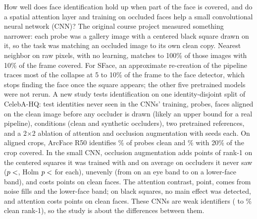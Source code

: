 How well does face identification hold up when part of the face is covered, and do a spatial attention layer and training on occluded faces help a small convolutional neural network (CNN)? The original course project measured something narrower: each probe was a gallery image with a centered black square drawn on it, so the task was matching an occluded image to its own clean copy. Nearest neighbor on raw pixels, with no learning, matches  to 100\% of those images with 10\% of the frame covered. For SFace, an approximate re-creation of the pipeline traces most of the collapse at 5 to 10\% of the frame to the face detector, which stops finding the face once the square appears; the other five pretrained models were not rerun. A new study tests identification on one identity-disjoint split of CelebA-HQ:  test identities never seen in the CNNs' training,  probes, faces aligned on the clean image before any occluder is drawn (likely an upper bound for a real pipeline),  conditions (clean and  synthetic occluders), two pretrained references, and a 2$\times$2 ablation of attention and occlusion augmentation with  seeds each. On aligned crops, ArcFace R50 identifies \% of probes clean and \% with 20\% of the crop covered. In the small CNN, occlusion augmentation adds  points of rank-1 on the centered squares it was trained with and  on average on occluders it never saw ($p<\N{P1_p}$, Holm $p<\N{P1_holm}$ for each), unevenly (from  on an eye band to  on a lower-face band), and costs  points on clean faces. The attention contrast,  point, comes from noise fills and the lower-face band; on black squares, no main effect was detected, and attention costs  points on clean faces. These CNNs are weak identifiers ( to \% clean rank-1), so the study is about the differences between them.
